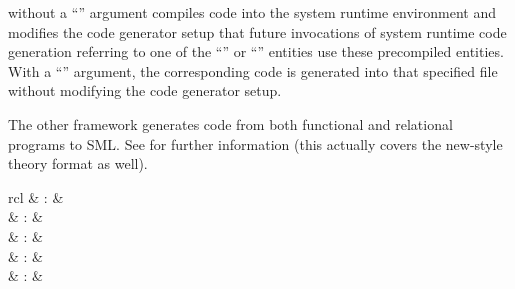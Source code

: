 \begin{isabellebody}
\begin{isamarkuptext}
\begin{description}
  \item \hyperlink{command.HOL.code-reflect}{\mbox{}} without a ``''
  argument compiles code into the system runtime environment and
  modifies the code generator setup that future invocations of system
  runtime code generation referring to one of the ``'' or ``'' entities use these precompiled
  entities.  With a ``'' argument, the corresponding code
  is generated into that specified file without modifying the code
  generator setup.

  \end{description}

  The other framework generates code from both functional and
  relational programs to SML.  See \cite{isabelle-HOL} for further
  information (this actually covers the new-style theory format as
  well).

  \begin{matharray}{rcl}
    \hypertarget{command.HOL.code-module}{\hyperlink{command.HOL.code-module}{\mbox{}}} & : &  \\
    \hypertarget{command.HOL.code-library}{\hyperlink{command.HOL.code-library}{\mbox{}}} & : &  \\
    \hypertarget{command.HOL.consts-code}{\hyperlink{command.HOL.consts-code}{\mbox{}}} & : &  \\
    \hypertarget{command.HOL.types-code}{\hyperlink{command.HOL.types-code}{\mbox{}}} & : &  \\
    \hypertarget{attribute.HOL.code}{\hyperlink{attribute.HOL.code}{\mbox{}}} & : &  \\
  \end{matharray}


\end{isamarkuptext}
\end{isabellebody}
